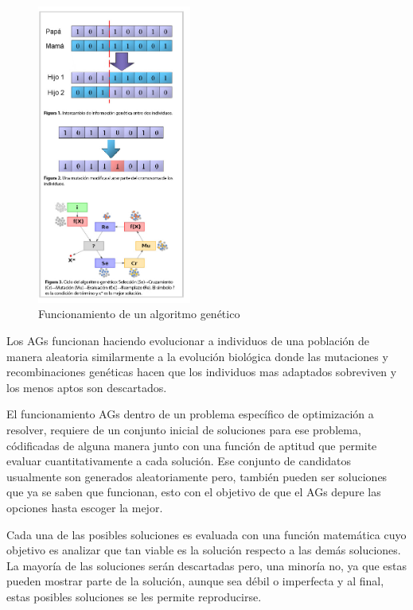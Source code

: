 \begin{figure}
    \begin{center}
        \includegraphics[width=0.45\textwidth]{TT/img/marco teorico/AGs.jpg}
        \caption{Funcionamiento de un algoritmo genético}
    \end{center}
    \label{graphic:AGs}
\end{figure}
Los \acrshort{AGs} funcionan haciendo evolucionar a individuos de una población de manera aleatoria similarmente a la evolución biológica donde las mutaciones y recombinaciones genéticas hacen que los individuos mas adaptados sobreviven y los menos aptos son descartados.

El funcionamiento \acrshort{AGs} dentro de un problema específico de optimización a resolver, requiere de un conjunto inicial de soluciones para ese problema, códificadas de alguna manera junto con una función de aptitud que permite evaluar cuantitativamente a cada solución. Ese conjunto de candidatos usualmente son generados aleatoriamente pero, también pueden ser soluciones que ya se saben que funcionan, esto con el objetivo de que el \acrshort{AGs} depure las opciones hasta escoger la mejor.

Cada una de las posibles soluciones es evaluada con una función matemática cuyo objetivo es analizar que tan viable es la solución respecto a las demás soluciones. La mayoría de las soluciones serán descartadas pero, una minoría no, ya que estas pueden mostrar parte de la solución, aunque sea débil o imperfecta y al final, estas posibles soluciones se les permite reproducirse.

